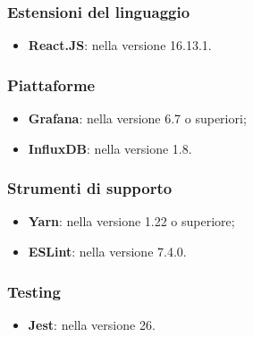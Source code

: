 \documentclass[../manuale-sviluppatore.tex]{subfiles}
\begin{document}
\subsubsection{Estensioni del linguaggio}
\begin{itemize}
  \item \textbf{React.JS}: nella versione 16.13.1.
\end{itemize}

\subsubsection{Piattaforme}
\begin{itemize}
  \item \textbf{Grafana}: nella versione 6.7 o superiori;
  \item \textbf{InfluxDB}: nella versione 1.8.
\end{itemize}

\subsubsection{Strumenti di supporto}
\begin{itemize}
  \item \textbf{Yarn}: nella versione 1.22 o superiore;
  \item \textbf{ESLint}: nella versione 7.4.0.
\end{itemize}

\subsubsection{Testing}
\begin{itemize}
  \item \textbf{Jest}: nella versione 26.
\end{itemize}
\end{document}
